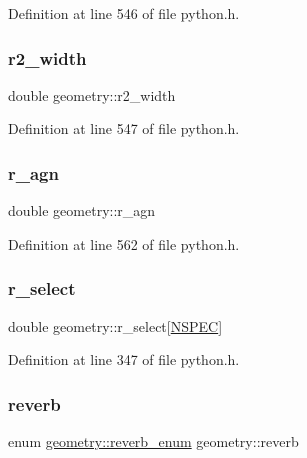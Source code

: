 Definition at line 546 of file python.\+h.

\mbox{\label{structgeometry_aa7a96429e84925ee52947efe9d8001ff}} 
\subsubsection{\texorpdfstring{r2\+\_\+width}{r2\_width}}
{\footnotesize\ttfamily double geometry\+::r2\+\_\+width}



Definition at line 547 of file python.\+h.

\mbox{\label{structgeometry_a042635649c58a769648e703a1d0c66fa}} 
\subsubsection{\texorpdfstring{r\+\_\+agn}{r\_agn}}
{\footnotesize\ttfamily double geometry\+::r\+\_\+agn}



Definition at line 562 of file python.\+h.

\mbox{\label{structgeometry_adf45001b1836a0566cf25d9151b0906d}} 
\subsubsection{\texorpdfstring{r\+\_\+select}{r\_select}}
{\footnotesize\ttfamily double geometry\+::r\+\_\+select\mbox{[}\hyperlink{python_8h_ade1df1cb82ae4ef9a5c0cddb37d9a73b}{N\+S\+P\+EC}\mbox{]}}



Definition at line 347 of file python.\+h.

\mbox{\label{structgeometry_a853e273c5a2a6630c2c1c609db0f47a1}} 
\subsubsection{\texorpdfstring{reverb}{reverb}}
{\footnotesize\ttfamily enum \hyperlink{structgeometry_aa560b242e44807dcdc99ef50ac44edf0}{geometry\+::reverb\+\_\+enum}  geometry\+::reverb}

